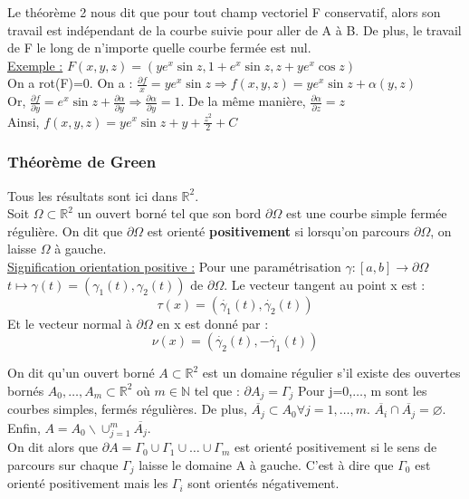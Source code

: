 \documentclass[../main.tex]{subfiles}
\begin{document}
Le théorème 2 nous dit que pour tout champ vectoriel F conservatif, alors son travail est indépendant de la courbe suivie pour aller de A à B. De plus, le travail de F le long de n'importe quelle courbe fermée est nul.\\

\quad \underline{Exemple :} $F(x,y,z) = (ye^x \sin{z}, 1+e^x\sin{z}, z+ye^x\cos{z})$\\
On a rot(F)=0. On a : $\frac{\partial f}{x} = ye^x\sin{z} \Rightarrow f(x,y,z) = ye^x \sin{z} + \alpha(y,z)$\\
Or, $\frac{\partial f}{\partial y} = e^x \sin{z} + \frac{\partial \alpha}{\partial y} \Rightarrow \frac{\partial \alpha}{\partial y} = 1$. De la même manière, $\frac{\partial \alpha}{\partial z} = z$\\
Ainsi, $f(x,y,z) = ye^x\sin{z} + y+\frac{z^2}{2}+C$

\subsubsection{Théorème de Green}
Tous les résultats sont ici dans $\mathbb{R}^2$.\\

Soit $\Omega \subset \mathbb{R}^2$ un ouvert borné tel que son bord $\partial \Omega$ est une courbe simple fermée régulière. On dit que $\partial \Omega$ est orienté \textbf{positivement} si lorsqu'on parcours $\partial \Omega$, on laisse $\Omega$ à gauche.\\

\quad \underline{Signification orientation positive :} Pour une paramétrisation $\gamma :[a,b] \rightarrow \partial \Omega$\\
$t\mapsto \gamma(t) = (\gamma_1(t), \gamma_2(t))$ de $\partial \Omega$. Le vecteur tangent au point x est :\\
\begin{equation}
    \tau(x) = (\dot{\gamma_1}(t), \dot{\gamma_2}(t))
\end{equation}
Et le vecteur normal à $\partial \Omega$ en x est donné par :\\
\begin{equation}
    \nu(x) = (\dot{\gamma_2}(t), -\dot{\gamma_1}(t))
\end{equation}

On dit qu'un ouvert borné $A\subset \mathbb{R}^2$ est un domaine régulier s'il existe des ouvertes bornés $A_0, \dots, A_m \subset \mathbb{R}^2$ où $m\in \mathbb{N}$ tel que : $\partial A_j = \Gamma_j$ Pour j=0,$\dots$, m sont les courbes simples, fermés régulières. De plus, $\overline{A_j} \subset A_0 \forall j=1, \dots, m$. $\overline{A_i} \cap \overline{A_j} = \varnothing$. Enfin, $A= A_0 \backslash \cup_{j=1}^m \overline{A_j}$.\\
On dit alors que $\partial A = \Gamma_0 \cup \Gamma_1 \cup \dots \cup \Gamma_m$ est orienté positivement si le sens de parcours sur chaque $\Gamma_j$ laisse le domaine A à gauche. C'est à dire que $\Gamma_0$ est orienté positivement mais les $\Gamma_i$ sont orientés négativement.\\
\end{document}
